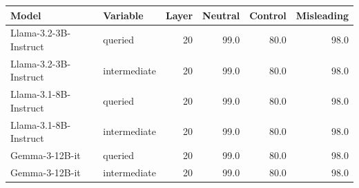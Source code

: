 \begin{tabular}{@{}llrrrr@{}}
\toprule
Model & Variable & Layer & Neutral & Control & Misleading \\
\midrule
Llama-3.2-3B-Instruct & queried & 20 & 99.0 & 80.0 & 98.0 \\
Llama-3.2-3B-Instruct & intermediate & 20 & 99.0 & 80.0 & 98.0 \\
Llama-3.1-8B-Instruct & queried & 20 & 99.0 & 80.0 & 98.0 \\
Llama-3.1-8B-Instruct & intermediate & 20 & 99.0 & 80.0 & 98.0 \\
Gemma-3-12B-it & queried & 20 & 99.0 & 80.0 & 98.0 \\
Gemma-3-12B-it & intermediate & 20 & 99.0 & 80.0 & 98.0 \\
\bottomrule
\end{tabular}
